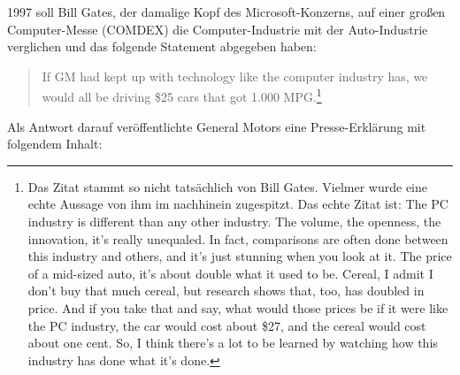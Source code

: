 1997 soll Bill Gates, der damalige Kopf des Microsoft-Konzerns, auf einer großen
Computer-Messe (COMDEX) die Computer-Industrie mit der Auto-Industrie
verglichen und das folgende Statement abgegeben haben:

\begin{quotation}
\noindent If GM had kept up with technology like the computer industry has, we
would all be driving \$25 cars that got 1.000 MPG.\footnote{Das Zitat
stammt so nicht tatsächlich von Bill Gates. Vielmer wurde eine echte Aussage
von ihm im nachhinein zugespitzt. Das echte Zitat ist: \glqq The PC industry is
different than any other industry. The volume, the openness, the innovation,
it's really unequaled. In fact, comparisons are often done between this
industry and others, and it's just stunning when you look at it. The price of a
mid-sized auto, it's about double what it used to be. Cereal, I admit I don't
buy that much cereal, but research shows that, too, has doubled in price. And
if you take that and say, what would those prices be if it were like the PC
industry, the car would cost about \$27, and the cereal would cost about one
cent. So, I think there's a lot to be learned by watching how this industry has
done what it's done.\grqq}
\end{quotation}


Als Antwort darauf veröffentlichte General Motors eine Presse-Erklärung mit
folgendem Inhalt:

